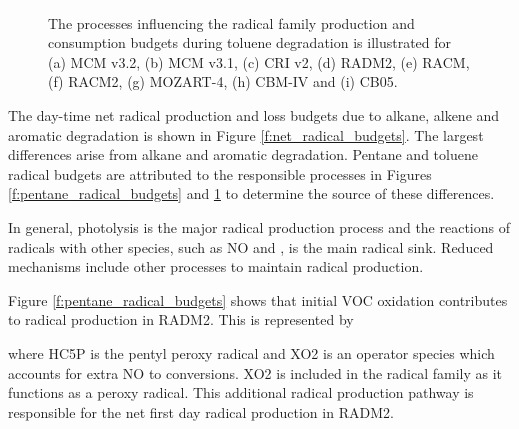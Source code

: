 \begin{figure}
    \begin{center}
        \includegraphics[width=\textwidth]{img/toluene_radical_budgets}
    \end{center}
    \caption{The processes influencing the radical family production and consumption budgets during toluene degradation is illustrated for (a) MCM v3.2, (b) MCM v3.1, (c) CRI v2, (d) RADM2, (e) RACM, (f) RACM2, (g) MOZART-4, (h) CBM-IV and (i) CB05.}
    \label{f:toluene_radical_budgets} 
\end{figure} 

The day-time net radical production and loss budgets due to alkane, alkene and aromatic degradation is shown in Figure \ref{f:net_radical_budgets}. 
The largest differences arise from alkane and aromatic degradation. 
Pentane and toluene radical budgets are attributed to the responsible processes in Figures \ref{f:pentane_radical_budgets} and \ref{f:toluene_radical_budgets} to determine the source of these differences.

In general, photolysis is the major radical production process and the reactions of radicals with other species, such as NO and , is the main radical sink. 
Reduced mechanisms include other processes to maintain radical production.

Figure \ref{f:pentane_radical_budgets} shows that initial VOC oxidation contributes to radical production in RADM2. 
This is represented by
\begin{reactionlist}
\end{reactionlist}
where HC5P is the pentyl peroxy radical and XO2 is an operator species which accounts for extra NO to  conversions. 
XO2 is included in the radical family as it functions as a peroxy radical. 
This additional radical production pathway is responsible for the net first day radical production in RADM2.

